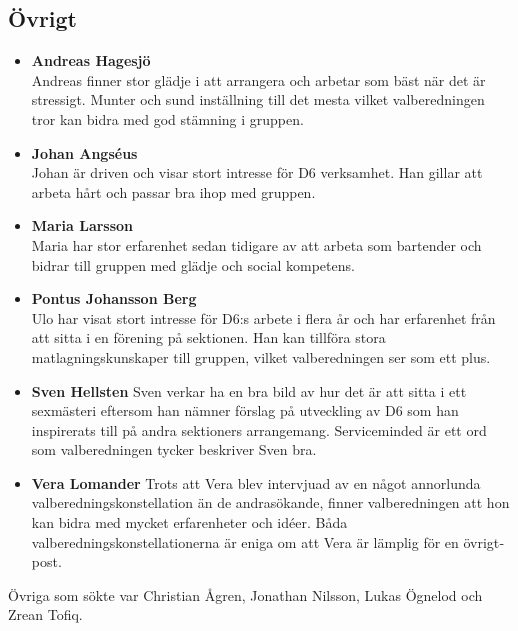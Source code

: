 \subsection{Övrigt}
\begin{autoframe}
\scriptsize
\begin{multicols}{2}
\begin{itemize}
\item \textbf{Andreas Hagesjö} \\
Andreas finner stor glädje i att arrangera och arbetar som bäst när det är stressigt. Munter och
sund inställning till det mesta vilket valberedningen tror kan bidra med god stämning i gruppen.

\item \textbf{Johan Angséus} \\
Johan är driven och visar stort intresse för D6 verksamhet. Han gillar att arbeta hårt och passar
bra ihop med gruppen.

\item \textbf{Maria Larsson} \\
Maria har stor erfarenhet sedan tidigare av att arbeta som bartender och bidrar till gruppen med
glädje och social kompetens.

\item \textbf{Pontus Johansson Berg} \\
Ulo har visat stort intresse för D6:s arbete i flera år och har erfarenhet från att sitta i en förening på sektionen. Han kan tillföra stora matlagningskunskaper till gruppen, vilket valberedningen ser som ett plus.

\item \textbf{Sven Hellsten}
Sven verkar ha en bra bild av hur det är att sitta i ett sexmästeri eftersom han nämner förslag på
utveckling av D6 som han inspirerats till på andra sektioners arrangemang. Service­minded är
ett ord som valberedningen tycker beskriver Sven bra.


\item \textbf{Vera Lomander}
Trots att Vera blev intervjuad av en något annorlunda valberedningskonstellation än de andrasökande, finner valberedningen att hon kan bidra med mycket erfarenheter och idéer.
Båda valberedningskonstellationerna är eniga om att Vera är lämplig för en övrigt­post.
\end{itemize}
\end{multicols}
Övriga som sökte var Christian Ågren, Jonathan Nilsson, Lukas Ögnelod och Zrean Tofiq.
\end{autoframe}